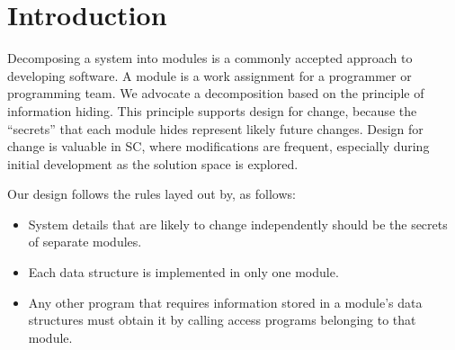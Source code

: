 \documentclass[12pt, titlepage]{article}
\begin{document}
\renewcommand{\arraystretch}{1.2}

\newpage

\tableofcontents

\listoftables

\listoffigures

\newpage


\section{Introduction}

Decomposing a system into modules is a commonly accepted approach to developing
software.  A module is a work assignment for a programmer or programming
team.  We advocate a decomposition
based on the principle of information hiding.  This
principle supports design for change, because the ``secrets'' that each module
hides represent likely future changes.  Design for change is valuable in SC,
where modifications are frequent, especially during initial development as the
solution space is explored.  

Our design follows the rules layed out by, as follows:
\begin{itemize}
\item System details that are likely to change independently should be the
  secrets of separate modules.
\item Each data structure is implemented in only one module.
\item Any other program that requires information stored in a module's data
  structures must obtain it by calling access programs belonging to that module.
\end{itemize}
\end{document}
